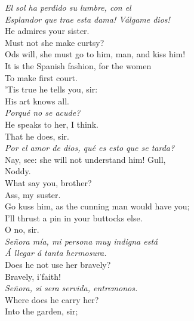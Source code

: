 \documentclass[a4paper,oneside,12pt]{memoir}
\begin{document}
\begin{drama*}
\surlyspeaks \emph{El sol ha perdido su lumbre, con el\\
Esplandor que trae esta dama! V\'{a}lgame dios!}\\
\facespeaks He admires your sister.\\
\kastrilspeaks {} Must not she make curtsy?\\
\subtlespeaks Ods will, she must go to him, man, and kiss him!\\
It is the Spanish fashion, for the women\\
To make first court.\\
\facespeaks {} 'Tis true he tells you, sir:\\
His art knows all.\\
\surlyspeaks {} \emph{Porqu\'{e} no se acude?}\\
\kastrilspeaks He speaks to her, I think.\\
\facespeaks {} That he does, sir.\\
\surlyspeaks \emph{Por el amor de dios, qu\'{e} es esto que se tarda?}\\
\kastrilspeaks Nay, see: she will not understand him! Gull,\\
Noddy.\\
\pliantspeaks {} What say you, brother?\\
\kastrilspeaks {} Ass, my suster.\\
Go kuss him, as the cunning man would have you;\\
I'll thrust a pin in your buttocks else.\\
\facespeaks {} O no, sir.\\
\surlyspeaks \emph{Se\~{n}ora m\'{i}a, mi persona muy indigna est\'{a}\\
\'{A} llegar \'{a} tanta hermosura.}\\
\facespeaks Does he not use her bravely?\\
\kastrilspeaks {} Bravely, i'faith!\\
\surlyspeaks \emph{Se\~{n}ora, si sera servida, entremonos.}\\
\kastrilspeaks Where does he carry her?\\
\facespeaks {} Into the garden, sir;\\

\end{drama*}
\end{document}
